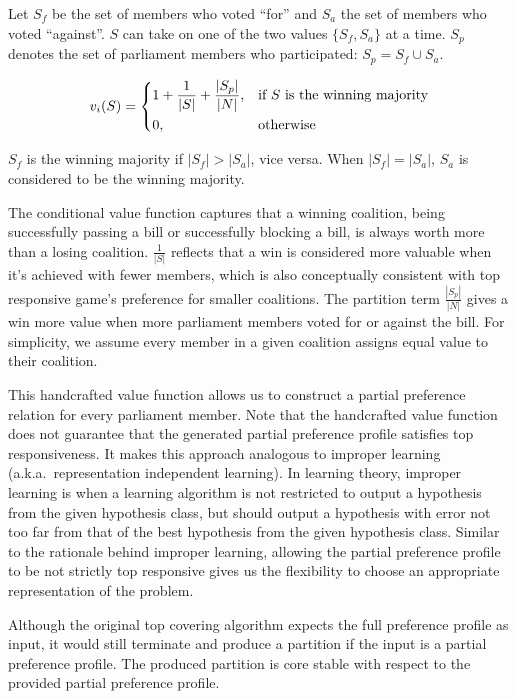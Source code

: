 Let $S_f$ be the set of members who voted ``for'' and
$S_a$ the set of members who voted ``against''.
$S$ can take on one of the two values $\{S_f, S_a\}$ at a time.
$S_p$ denotes the set of parliament members who participated: $S_p = S_f \cup S_a$.

\[
  v_i(S) =
  \begin{dcases}
      1 + \frac{1}{|S|} + \frac{|S_p|}{|N|},& \text{if $S$ is the winning majority}\\
      0,              & \text{otherwise}
  \end{dcases}
\]

$S_f$ is the winning majority if $|S_f| > |S_a|$, vice versa. When $|S_f| = |S_a|$, $S_a$ is considered to be the winning majority.

The conditional value function captures that a winning coalition,
being successfully passing a bill or successfully blocking a bill,
is always worth more than a losing coalition.
$\frac{1}{|S|}$ reflects that a win is considered more valuable when it's
achieved with fewer members, which is also conceptually consistent with
top responsive game's preference for smaller coalitions.
The partition term $\frac{|S_p|}{|N|}$ gives a win more value when more
parliament members voted for or against the bill.
For simplicity, we assume every member in a given coalition assigns
equal value to their coalition.

This handcrafted value function allows us to construct a partial preference
relation for every parliament member.
Note that the handcrafted value function does not guarantee that the generated partial preference profile satisfies top responsiveness.
It makes this approach analogous to improper learning (a.k.a.\ representation independent learning).
In learning theory, improper learning is when a learning algorithm is not
restricted to output a hypothesis from the given hypothesis class,
but should output a hypothesis with error not too far from that of
the best hypothesis from the given hypothesis class.
Similar to the rationale behind improper learning, allowing the
partial preference profile to be not strictly top responsive gives us
the flexibility to choose an appropriate representation of the problem.

Although the original top covering algorithm expects the full preference
profile as input, it would still terminate and produce a partition
if the input is a partial preference profile.
The produced partition is core stable with respect to the provided partial
preference profile.

